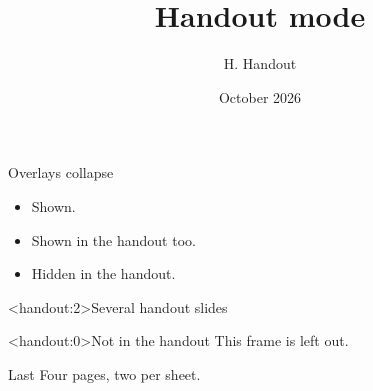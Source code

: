 \documentclass[handout]{beamer}
\title{Handout mode}
\author{H. Handout}
\date{October 2026}
\begin{document}
\begin{frame}\titlepage\end{frame}
\begin{frame}{Overlays collapse}
  \begin{itemize}
    \item<1-> Shown.
    \item<2-> Shown in the handout too.
    \item<3-| handout:0> Hidden in the handout.
  \end{itemize}
\end{frame}
\begin{frame}<handout:2>{Several handout slides}
\end{frame}
\begin{frame}<handout:0>{Not in the handout}
  This frame is left out.
\end{frame}
\begin{frame}{Last}
  Four pages, two per sheet.
\end{frame}
\end{document}
